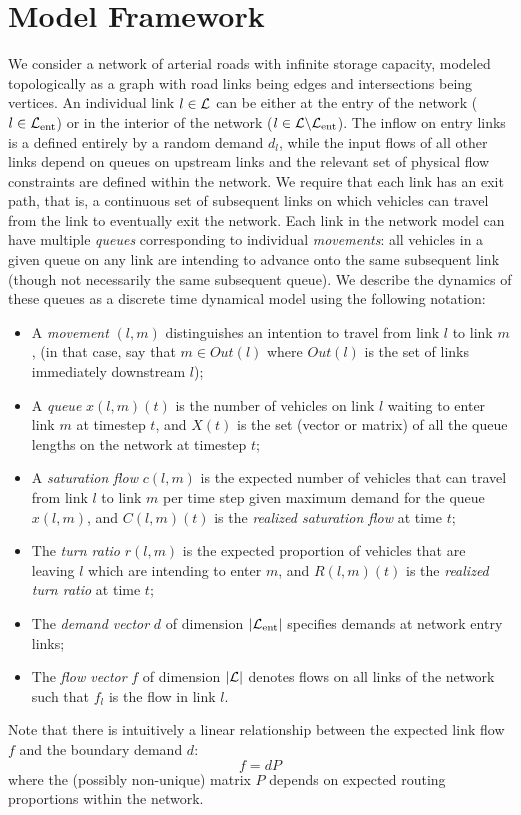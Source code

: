 \section{Model Framework} \label{sec:framework}
We consider a network of arterial roads with infinite storage capacity, modeled topologically as a graph with road links being edges and intersections being vertices. An individual link $l\in\mathcal{L}$  can be either at the entry of the network ($l \in \mathcal{L}_{\text{ent}}$) or in the interior of the network ($l \in\mathcal{L}\backslash \mathcal{L}_{\text{ent}} $). The inflow on entry links is a defined entirely by a random demand $d_{l}$, while the input flows of all other links depend on queues on upstream links and the relevant set of physical flow constraints are defined within the network. We require that each link has an exit path, that is, a continuous set of subsequent links on which vehicles can travel from the link to eventually exit the network.  Each link in the network model can have multiple \emph{queues} corresponding to individual \emph{movements}:  all vehicles in a given queue on any link are intending to advance onto the same subsequent link (though not necessarily the same subsequent queue). We describe the dynamics of these queues as a discrete time dynamical model using the following notation: 
\begin{itemize}
 \itemsep 1pt \parskip 0pt
\item A \emph{movement} $(l,m)$ distinguishes an intention to travel from link $l$ to link $m$,
(in that case, say that $m \in Out(l)$ where $Out(l)$ is the set of links immediately downstream $l$);
\item A \emph{queue} $x(l,m)(t)$ is the number of vehicles on link $l$ waiting to enter link $m$ at timestep $t$, and $X(t)$ is the set (vector or matrix) of all the queue lengths on the network at timestep $t$;
\item A \emph{saturation flow} $c(l,m)$ is the expected number of vehicles that can travel from link $l$ to link $m$ per time step given maximum demand for the queue $x(l,m)$, and $C(l,m)(t)$ is the \emph{realized saturation flow} at time $t$; 
\item The \emph{turn ratio} $r(l,m)$ is the expected proportion of vehicles that are leaving $l$ which are intending to enter $m$, and $R(l,m)(t)$ is the \emph{realized turn ratio} at time $t$;
\item The \emph{demand vector} $d$ of dimension $|\mathcal{L}_{\text{ent}}|$ specifies demands at network entry links;
\item The \emph{flow vector} $f$ of dimension $|\mathcal{L}|$ denotes flows on all links of the network such that $f_{l}$ is the flow in link $l$. 
\end{itemize}
Note that there is intuitively a linear relationship between the expected link flow $f$ and the boundary demand $d$: 
\begin{equation} \label{fd_relation}
f=dP
\end{equation}
where the (possibly non-unique) matrix $P$ depends on expected routing proportions within the network.
